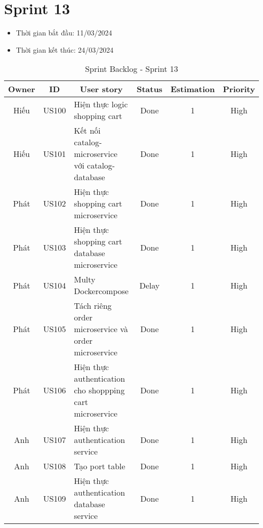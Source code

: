 \section{Sprint 13}
\begin{itemize}
    \item Thời gian bắt đầu: 11/03/2024
    \item Thời gian kết thúc: 24/03/2024
\end{itemize}
\begin{table}[H]
    \begin{tabular}{|c|c|m{6cm}|c|c|c|}
    \hline
    \textbf{Owner} & \textbf{ID} & \multicolumn{1}{c|}{\textbf{User story}}                                & \textbf{Status} & \textbf{Estimation} & \textbf{Priority} \\ \hline
    Hiếu         & US100        & Hiện thực logic shopping cart                    & Done            & 1                   & High         \\ \hline
    Hiếu        & US101        & Kết nối catalog-microservice với catalog-database                    & Done            & 1                   & High         \\ \hline
    Phát         & US102        & Hiện thực shopping cart microservice                   & Done            & 1                   & High         \\ \hline
    Phát        & US103        & Hiện thực shopping cart database microservice                     & Done            & 1                   & High         \\ \hline
    Phát        & US104        & Multy Dockercompose                     & Delay           & 1                   & High         \\ \hline
    Phát        & US105        & Tách riêng order microservice và order microservice                    & Done            & 1                   & High         \\ \hline
    Phát        & US106        & Hiện thực authentication cho shoppping cart microservice                     & Done            & 1                   & High         \\ \hline
    Anh        & US107        & Hiện thực authentication service                     & Done            & 1                   & High         \\ \hline
    Anh        & US108        & Tạo port table                     & Done            & 1                   & High         \\ \hline
    Anh        & US109        & Hiện thực authentication database service                    & Done            & 1                   & High         \\ \hline
    \end{tabular}
    \caption{Sprint Backlog - Sprint 13}
    \label{tab:sprint-13}
\end{table}